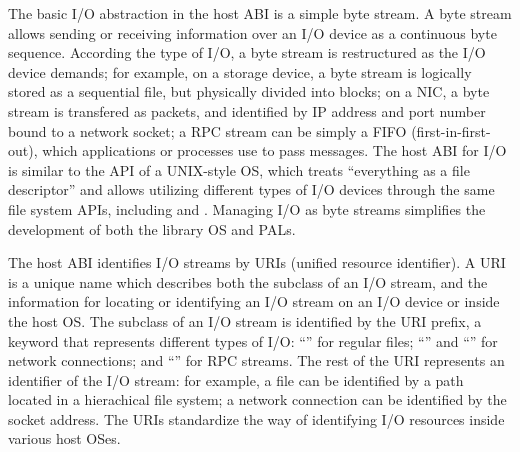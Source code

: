 The basic I/O abstraction in the host ABI
is a simple byte stream.
A byte stream allows sending or receiving information over an I/O device
as a continuous byte sequence.
According the type of I/O, a byte stream is restructured as the I/O device demands;
for example, on a storage device,
a byte stream is logically stored as a sequential file,
but physically divided into blocks;
on a NIC, a byte stream is transfered as packets, and identified by IP address and port number bound to a network socket;
a RPC stream can be simply a FIFO (first-in-first-out),
which applications or processes use to pass messages.
The host ABI for I/O is similar to the API of a UNIX-style OS,
which treats ``everything as a file descriptor''
and allows utilizing different types of I/O devices through the same file system APIs, including  and .
Managing I/O as byte streams simplifies the development of both the library OS and PALs.


The host ABI identifies I/O streams by URIs (unified resource identifier).
A URI is a unique name which describes 
both the subclass of an I/O stream, and the information for locating or identifying an I/O stream on an I/O device or inside the host OS.
The subclass of an I/O stream is identified by the URI prefix,
a keyword that represents different types of I/O: ``'' for regular files; ``'' and ``'' for network connections; and ``'' for RPC streams.
The rest of the URI represents an identifier of the I/O stream:
for example, a file can be identified by a path located in a hierachical file system;
a network connection can be identified by the socket address.
The URIs standardize the way of identifying I/O resources inside various host OSes.




